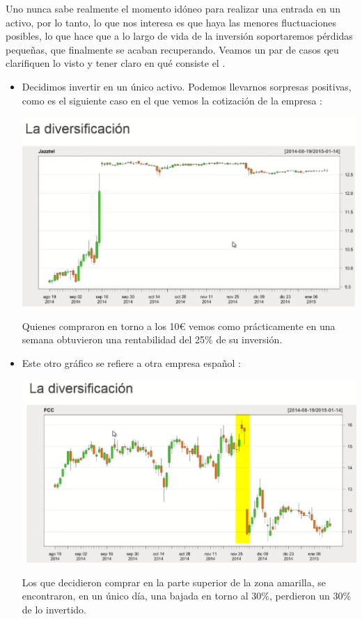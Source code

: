 Uno nunca sabe realmente el momento idóneo para realizar una entrada en un activo, por lo tanto, lo que nos interesa es que haya las menores fluctuaciones posibles, lo que hace que a lo largo de vida de la inversión soportaremos pérdidas pequeñas, que finalmente se acaban recuperando. Veamos un par de casos qeu clarifiquen lo visto y tener claro en qué consiste el .

\begin{itemize}
    \item Decidimos invertir en un único activo. Podemos llevarnos sorpresas positivas, como es el siguiente caso en el que vemos la cotización de la empresa :
    \begin{center}
        \includegraphics[scale=0.65]{images/jazztel.png}
    \end{center}
    Quienes compraron en torno a los 10€ vemos como prácticamente en una semana obtuvieron una rentabilidad del 25\% de su inversión.
    \item Este otro gráfico se refiere a otra empresa español :
    \begin{center}
        \includegraphics[scale=0.65]{images/fcc.png}
    \end{center}
    Los que decidieron comprar en la parte superior de la zona amarilla, se encontraron, en un único día, una bajada en torno al 30\%, perdieron un 30\% de lo invertido. 
\end{itemize}

